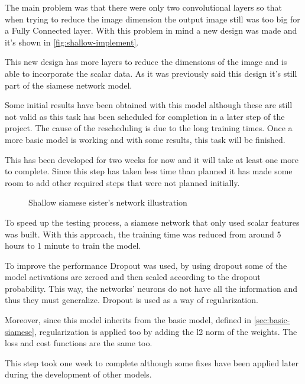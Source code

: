 The main problem was that there were only two convolutional layers so that when trying to reduce
the image dimension the output image still was too big for a Fully Connected layer. With this
problem in mind a new design was made and it's shown in \autoref{fig:shallow-implement}.

This new design has more layers to reduce the dimensions of the image and is able to 
incorporate the scalar data. As it was previously said this design it's still part of the
siamese network model.

Some initial results have been obtained with this model although these are still not valid as
this task has been scheduled for completion in a later step of the project. The cause of the 
rescheduling is due to the long training times. Once a more basic model is working and
with some results, this task will be finished.

This has been developed for two weeks for now and it will take at least one more to complete.
Since this step has taken less time than planned it has made some room to add other required
steps that were not planned initially.

\begin{figure}
  \centering
  
  \caption{Shallow siamese sister's network illustration \label{fig:shallow-implement}}
\end{figure}


\label{sec:scalar-only}

To speed up the testing process, a siamese network that only used scalar features 
was built. With this approach, the training time was reduced from around 5 hours 
to 1 minute to train the model. 

To improve the performance Dropout \cite{neural:dropout} was used, by using dropout some 
of the model activations are zeroed and then scaled according to the dropout probability. 
This way, the networks' neurons do not have all the information and thus they must generalize. 
Dropout is used as a way of regularization. 

Moreover, since this model inherits from the basic model, defined in \autoref{sec:basic-siamese}, 
regularization is applied too by adding the l2 norm of the weights. The loss and
cost functions are the same too.

This step took one week to complete although some fixes have been applied later during the
development of other models.

